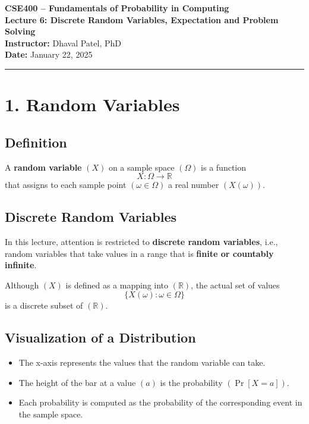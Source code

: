 \documentclass[11pt]{article}
\begin{document}
\begin{center}
\textbf{CSE400 – Fundamentals of Probability in Computing} \\[0.2cm]
\textbf{Lecture 6: Discrete Random Variables, Expectation and Problem Solving} \\
\textbf{Instructor:} Dhaval Patel, PhD \\
\textbf{Date:} January 22, 2025
\end{center}

\hrule
\vspace{0.4cm}

\section*{1. Random Variables}

\subsection*{Definition}

A \textbf{random variable} $(X)$ on a sample space $(\Omega)$ is a function
\[
X : \Omega \rightarrow \mathbb{R}
\]
that assigns to each sample point $(\omega \in \Omega)$ a real number $(X(\omega))$.

\subsection*{Discrete Random Variables}

In this lecture, attention is restricted to \textbf{discrete random variables}, i.e., random variables that take values in a range that is \textbf{finite or countably infinite}.

Although $(X)$ is defined as a mapping into $(\mathbb{R})$, the actual set of values
\[
\{ X(\omega) : \omega \in \Omega \}
\]
is a discrete subset of $(\mathbb{R})$.

\subsection*{Visualization of a Distribution}

\begin{itemize}
\item The x-axis represents the values that the random variable can take.
\item The height of the bar at a value $(a)$ is the probability $(\Pr[X = a])$.
\item Each probability is computed as the probability of the corresponding event in the sample space.
\end{itemize}
\end{document}
